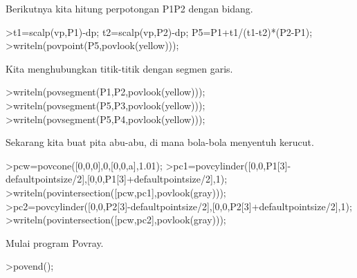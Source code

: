 \documentclass[a4paper,10pt]{article}
\begin{document}
\begin{eulernotebook}
\begin{eulercomment}
\begin{eulercomment}
\begin{eulercomment}
\begin{eulercomment}
\begin{eulercomment}
\begin{eulercomment}
\begin{eulercomment}
\begin{eulercomment}
\begin{eulercomment}
\begin{eulercomment}
\begin{eulercomment}
\begin{eulercomment}
\begin{eulercomment}
\begin{eulercomment}
\begin{eulercomment}
\begin{eulercomment}
\begin{eulercomment}
\begin{eulercomment}
\begin{eulercomment}
\begin{eulercomment}
\begin{eulercomment}
\begin{eulercomment}
\begin{eulercomment}
\begin{eulercomment}
\begin{eulercomment}
\begin{eulercomment}
\begin{eulercomment}
\begin{eulercomment}
\begin{eulercomment}
\begin{eulercomment}
\begin{eulercomment}
\begin{eulercomment}
\begin{eulercomment}
\begin{eulercomment}
\begin{eulercomment}
\begin{eulercomment}
\begin{eulercomment}
\begin{eulercomment}
\begin{eulercomment}
\begin{eulercomment}
\begin{eulercomment}
\begin{eulercomment}
\begin{eulercomment}
Berikutnya kita hitung perpotongan P1P2 dengan bidang.
\end{eulercomment}
\begin{eulerprompt}
>t1=scalp(vp,P1)-dp; t2=scalp(vp,P2)-dp; P5=P1+t1/(t1-t2)*(P2-P1);
>writeln(povpoint(P5,povlook(yellow)));
\end{eulerprompt}
\begin{eulercomment}
Kita menghubungkan titik-titik dengan segmen garis.
\end{eulercomment}
\begin{eulerprompt}
>writeln(povsegment(P1,P2,povlook(yellow)));
>writeln(povsegment(P5,P3,povlook(yellow)));
>writeln(povsegment(P5,P4,povlook(yellow)));
\end{eulerprompt}
\begin{eulercomment}
Sekarang kita buat pita abu-abu, di mana bola-bola menyentuh kerucut.
\end{eulercomment}
\begin{eulerprompt}
>pcw=povcone([0,0,0],0,[0,0,a],1.01);
>pc1=povcylinder([0,0,P1[3]-defaultpointsize/2],[0,0,P1[3]+defaultpointsize/2],1);
>writeln(povintersection([pcw,pc1],povlook(gray)));
>pc2=povcylinder([0,0,P2[3]-defaultpointsize/2],[0,0,P2[3]+defaultpointsize/2],1);
>writeln(povintersection([pcw,pc2],povlook(gray)));
\end{eulerprompt}
\begin{eulercomment}
Mulai program Povray.
\end{eulercomment}
\begin{eulerprompt}
>povend();
\end{eulerprompt}

\end{eulercomment}
\end{eulercomment}
\end{eulercomment}
\end{eulercomment}
\end{eulercomment}
\end{eulercomment}
\end{eulercomment}
\end{eulercomment}
\end{eulercomment}
\end{eulercomment}
\end{eulercomment}
\end{eulercomment}
\end{eulercomment}
\end{eulercomment}
\end{eulercomment}
\end{eulercomment}
\end{eulercomment}
\end{eulercomment}
\end{eulercomment}
\end{eulercomment}
\end{eulercomment}
\end{eulercomment}
\end{eulercomment}
\end{eulercomment}
\end{eulercomment}
\end{eulercomment}
\end{eulercomment}
\end{eulercomment}
\end{eulercomment}
\end{eulercomment}
\end{eulercomment}
\end{eulercomment}
\end{eulercomment}
\end{eulercomment}
\end{eulercomment}
\end{eulercomment}
\end{eulercomment}
\end{eulercomment}
\end{eulercomment}
\end{eulercomment}
\end{eulercomment}
\end{eulercomment}
\end{eulernotebook}
\end{document}

